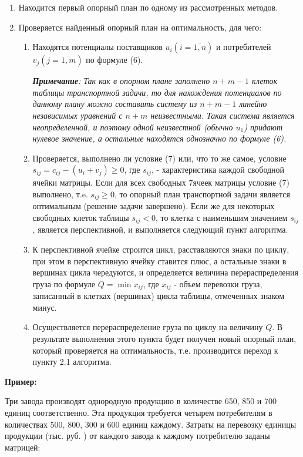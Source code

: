 \documentclass[a4paper,12pt]{article}
\begin{document}
	\begin{enumerate} 
		\item Находится первый опорный план по одному из рассмотренных методов.
		\item Проверяется найденный опорный план на оптимальность, для чего:
		\begin{enumerate} 
			\item Находятся потенциалы поставщиков $u_i (i = \overline{1,n})$ и потребителей $v_j (j = \overline{1,m})$ по формуле (6).
			
			\textit{\textbf{Примечание}: Так как в опорном плане заполнено $n + m - 1$ клеток таблицы транспортной задачи, то для нахождения потенциалов по данному плану можно составить систему из $n + m - 1$ линейно независимых уравнений с $n + m$ неизвестными. Такая система является неопределенной, и поэтому одной неизвестной (обычно $u_1$) придают нулевое значение, а остальные находятся однозначно по формуле (6).}
			 
			\item Проверяется, выполнено ли условие (7) или, что то же самое, условие $s_{ij} = c_{ij} - (u_i + v_j) \geqslant 0$, где $s_{ij}$, - характеристика каждой свободной ячейки матрицы. Если для всех свободных 7ячеек матрицы условие (7) выполнено, т.e. $s_{ij} \geqslant 0$, то опорный план транспортной задачи является оптимальным (решение задачи завершено). Если же для некоторых свободных клеток таблицы $s_{ij} < 0$, то клетка с наименьшим значением $s_{ij}$, является перспективной, и выполняется следующий пункт алгоритма.
			
			\item К перспективной ячейке строится цикл, расставляются знаки по циклу, при этом в перспективную ячейку ставится плюс, а остальные знаки в вершинах цикла чередуются, и определяется величина перераспределения груза по формуле $Q = \min x_{ij}$, где $x_{ij}$ - объем перевозки груза, записанный в клетках (вершинах) цикла таблицы, отмеченных знаком минус.
			
			\item Осуществляется перераспределение груза по циклу на величину $Q$. В результате выполнения этого пункта будет получен новый опорный план, который проверяется на оптимальность, т.е. производится переход к пункту 2.1 алгоритма.
		\end{enumerate}
	\end{enumerate}
	
	\textbf{Пример:} 
	
	Три завода производят однородную продукцию в количестве 650, 850 и 700 единиц соответственно. Эта продукция требуется четырем потребителям в количествах 500, 800, 300 и 600 единиц каждому. Затраты на перевозку единицы продукции (тыс. руб. ) от каждого завода к каждому потребителю заданы матрицей:
	
\end{document}
